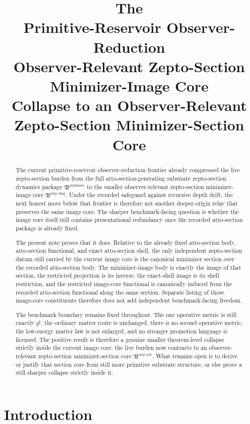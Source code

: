 \documentclass[11pt]{article}
\title{\textbf{The \TheoryName{}}\\[0.4em]
\large Primitive-Reservoir Observer-Reduction\\
\large Observer-Relevant Zepto-Section Minimizer-Image Core\\
\large Collapse to an Observer-Relevant Zepto-Section Minimizer-Section Core}
\author{}
\date{}
\newcommand{\CompletedMetric}{g^{\sharp}}
\newcommand{\ZeptoSectionPackage}{\mathfrak B^{\mathrm{zeptosec}}}
\newcommand{\ZeptoImageCore}{\mathfrak B^{\mathrm{zep,img}}}
\newcommand{\ZeptoMinSectionCore}{\mathfrak B^{\mathrm{zep,sec}}}
\begin{document}
\maketitle

\begin{abstract}
The current primitive-reservoir observer-reduction frontier already compressed the live zepto-section burden from the full atto-section-generating substrate zepto-section dynamics package \(\ZeptoSectionPackage\) to the smaller observer-relevant zepto-section minimizer-image core \(\ZeptoImageCore\). Under the recorded safeguard against recursive depth drift, the next honest move below that frontier is therefore not another deeper-origin relay that preserves the same image core. The sharper benchmark-facing question is whether the image core itself still contains presentational redundancy once the recorded atto-section package is already fixed.

The present note proves that it does. Relative to the already fixed atto-section body, atto-section functional, and exact atto-section shell, the only independent zepto-section datum still carried by the current image core is the canonical minimizer section over the recorded atto-section body. The minimizer-image body is exactly the image of that section, the restricted projection is its inverse, the exact-shell image is its shell restriction, and the restricted image-core functional is canonically induced from the recorded atto-section functional along the same section. Separate listing of those image-core constituents therefore does not add independent benchmark-facing freedom.

The benchmark boundary remains fixed throughout. The one operative metric is still exactly \(\CompletedMetric\), the ordinary matter route is unchanged, there is no second operative metric, the low-energy matter law is not enlarged, and no stronger promotion language is licensed. The positive result is therefore a genuine smaller theorem-level collapse strictly inside the current image core: the live burden now contracts to an observer-relevant zepto-section minimizer-section core \(\ZeptoMinSectionCore\). What remains open is to derive or justify that section core from still more primitive substrate structure, or else prove a still sharper collapse strictly inside it.
\end{abstract}

\section{Introduction}
\end{document}
